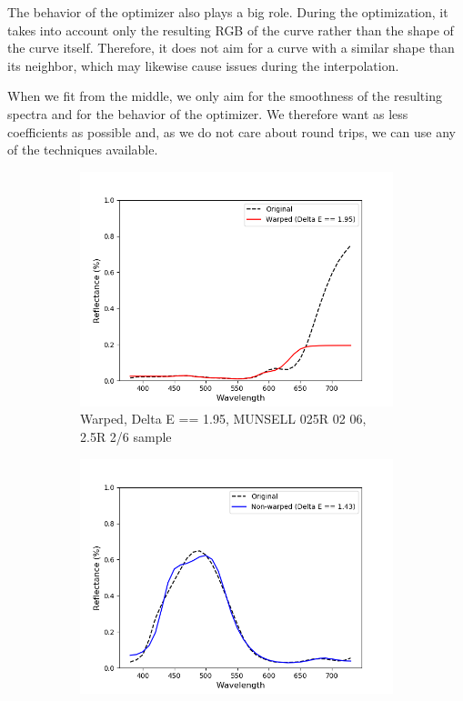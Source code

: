 The behavior of the optimizer also plays a big role. During the optimization, it takes into account only the resulting RGB of the curve rather than the shape of the curve itself. Therefore, it does not aim for a curve with a similar shape than its neighbor, which may likewise cause issues during the interpolation.

When we fit from the middle, we only aim for the smoothness of the resulting spectra and for the behavior of the optimizer. We therefore want as less coefficients as possible and, as we do not care about round trips, we can use any of the techniques available.


\begin{figure}[t]
	\centering
	\vspace{1em}
	\begin{subfigure}[t]{0.49\textwidth}
		\includegraphics[width=\linewidth]{img/results_worstWarped.png}
		\caption{Warped, Delta E == 1.95, MUNSELL 025R 02 06, 2.5R 2/6 sample }
		\label{fig:resultWorstWarp}
	\end{subfigure} \hspace{0.1em}
	\begin{subfigure}[t]{0.49\textwidth}
		\includegraphics[width=\linewidth]{img/results_worstNonWarped.png}

\end{subfigure}
\end{figure}
